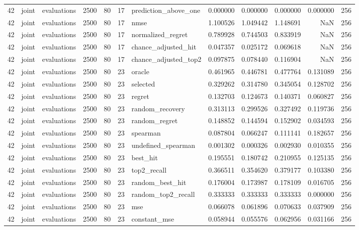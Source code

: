 \begin{tabular}{rllrrrlrrrrr}
42 & joint & evaluations & 2500 & 80 & 17 & prediction_above_one & 0.000000 & 0.000000 & 0.000000 & 0.000000 & 256 \\
42 & joint & evaluations & 2500 & 80 & 17 & nmse & 1.100526 & 1.049442 & 1.148691 & NaN & 256 \\
42 & joint & evaluations & 2500 & 80 & 17 & normalized_regret & 0.789928 & 0.744503 & 0.833919 & NaN & 256 \\
42 & joint & evaluations & 2500 & 80 & 17 & chance_adjusted_hit & 0.047357 & 0.025172 & 0.069618 & NaN & 256 \\
42 & joint & evaluations & 2500 & 80 & 17 & chance_adjusted_top2 & 0.097875 & 0.078440 & 0.116904 & NaN & 256 \\
42 & joint & evaluations & 2500 & 80 & 23 & oracle & 0.461965 & 0.446781 & 0.477764 & 0.131089 & 256 \\
42 & joint & evaluations & 2500 & 80 & 23 & selected & 0.329262 & 0.314780 & 0.345054 & 0.128702 & 256 \\
42 & joint & evaluations & 2500 & 80 & 23 & regret & 0.132703 & 0.124673 & 0.140371 & 0.060827 & 256 \\
42 & joint & evaluations & 2500 & 80 & 23 & random_recovery & 0.313113 & 0.299526 & 0.327492 & 0.119736 & 256 \\
42 & joint & evaluations & 2500 & 80 & 23 & random_regret & 0.148852 & 0.144594 & 0.152902 & 0.034593 & 256 \\
42 & joint & evaluations & 2500 & 80 & 23 & spearman & 0.087804 & 0.066247 & 0.111141 & 0.182657 & 256 \\
42 & joint & evaluations & 2500 & 80 & 23 & undefined_spearman & 0.001302 & 0.000326 & 0.002930 & 0.010355 & 256 \\
42 & joint & evaluations & 2500 & 80 & 23 & best_hit & 0.195551 & 0.180742 & 0.210955 & 0.125135 & 256 \\
42 & joint & evaluations & 2500 & 80 & 23 & top2_recall & 0.366511 & 0.354620 & 0.379177 & 0.103380 & 256 \\
42 & joint & evaluations & 2500 & 80 & 23 & random_best_hit & 0.176004 & 0.173987 & 0.178109 & 0.016705 & 256 \\
42 & joint & evaluations & 2500 & 80 & 23 & random_top2_recall & 0.333333 & 0.333333 & 0.333333 & 0.000000 & 256 \\
42 & joint & evaluations & 2500 & 80 & 23 & mse & 0.066078 & 0.061896 & 0.070633 & 0.037909 & 256 \\
42 & joint & evaluations & 2500 & 80 & 23 & constant_mse & 0.058944 & 0.055576 & 0.062956 & 0.031166 & 256 \\

\end{tabular}
